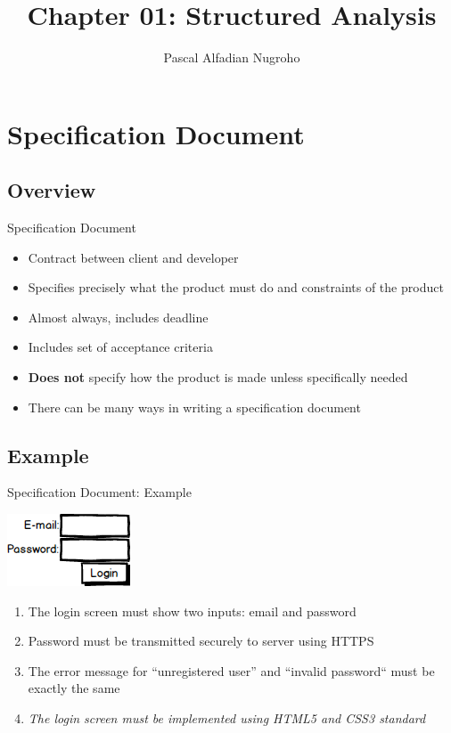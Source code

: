 \documentclass{beamer}
\title{Chapter 01: Structured Analysis}
\author[P.A. Nugroho]{Pascal Alfadian Nugroho}
\institute[IF-UNPAR]{Program Studi Informatika, \\Universitas Katolik Parahyangan}
\begin{document}
	\begin{frame}
		\titlepage
	\end{frame}
	
	\section{Specification Document}
	\subsection{Overview}
	\begin{frame}{Specification Document}
		\begin{itemize}
			\item Contract between client and developer
			\item Specifies precisely what the product must do and constraints of the product
			\item Almost always, includes deadline
			\item Includes set of acceptance criteria
			\item \textbf{Does not} specify how the product is made unless specifically needed
			\item There can be many ways in writing a specification document
		\end{itemize}
	\end{frame}
	\subsection{Example}
	\begin{frame}{Specification Document: Example}
		\begin{center}
			\includegraphics[scale=0.5]{img/01_login}
		\end{center}
		\begin{enumerate}
			\item The login screen must show two inputs: email and password
			\item Password must be transmitted securely to server using HTTPS
			\item The error message for ``unregistered user'' and ``invalid password`` must be exactly the same
			\item \textit{The login screen must be implemented using HTML5 and CSS3 standard} %
		\end{enumerate}
	\end{frame}
\end{document}
